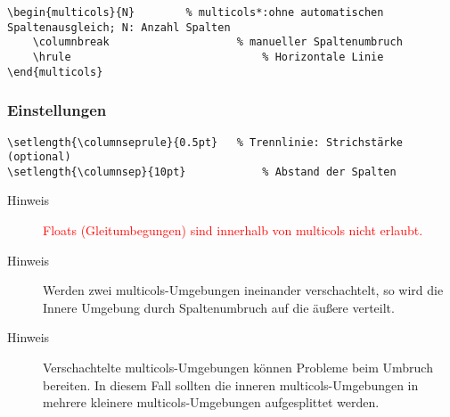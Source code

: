 \setlength{\columnseprule}{0.5pt}

\columnbreak
{}
\negAbstand

\begin{lstlisting} 
\begin{multicols}{N}		% multicols*:ohne automatischen Spaltenausgleich; N: Anzahl Spalten
	\columnbreak					% manueller Spaltenumbruch
	\hrule								% Horizontale Linie
\end{multicols}
\end{lstlisting}

\subsubsection*{Einstellungen}
\negAbstand

\begin{lstlisting} 
\setlength{\columnseprule}{0.5pt}	% Trennlinie: Strichstärke (optional)
\setlength{\columnsep}{10pt}			% Abstand der Spalten
\end{lstlisting}

\begin{description}

\item[Hinweis] \textcolor{red}{Floats (Gleitumbegungen) sind innerhalb von multicols nicht erlaubt.} 

\item[Hinweis] Werden zwei multicols-Umgebungen ineinander verschachtelt, so wird die Innere Umgebung durch Spaltenumbruch auf die äußere verteilt.

\item[Hinweis] Verschachtelte multicols-Umgebungen können Probleme beim Umbruch bereiten. In diesem Fall sollten die inneren multicols-Umgebungen in mehrere kleinere multicols-Umgebungen aufgesplittet werden.
\end{description}
